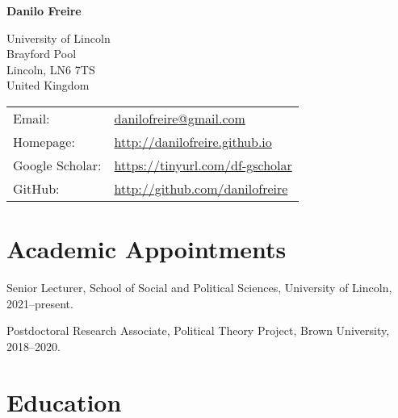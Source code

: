 \documentclass[a4paper]{article}
\def\name{Danilo Freire}
\renewenvironment{itemize}{
	\begin{list}{}{
			\setlength{\leftmargin}{1.5em}
		}
		}{
	\end{list}
}
\begin{document}
{\huge \bf \name}


\vspace{0.25in}

\begin{minipage}{0.45\linewidth}
	University of Lincoln\\
  Brayford Pool\\
	Lincoln, LN6 7TS\\
	United Kingdom
\end{minipage}
\begin{minipage}{0.45\linewidth}
	\begin{tabular}{ll}
		Email:          & \href{mailto:danilofreire@gmail.com}{danilofreire@gmail.com}          \\
		Homepage:       & \href{http://danilofreire.github.io/}{http://danilofreire.github.io}   \\
    Google Scholar: & \href{https://tinyurl.com/df-gscholar}{https://tinyurl.com/df-gscholar} \\
		GitHub:         & \href{http://github.com/danilofreire}{http://github.com/danilofreire}
	\end{tabular}
	\end{minipage}

\section*{Academic Appointments}

\begin{itemize}
\item Senior Lecturer, School of Social and Political Sciences, University of Lincoln, 2021--present.
\item Postdoctoral Research Associate, Political Theory Project, Brown University, 2018--2020.
\end{itemize}

\section*{Education}
\end{document}
